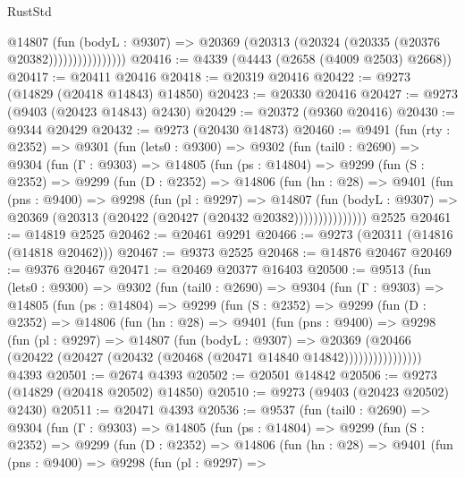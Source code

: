 \begin{lexlean}{RustStd}
\begin{coremodule}
{\begin{coremodule}
{{{{{{{{{{{{{{{{{{{{{{{{{{{{{{{{{{{{{{{{{{{{{{{{{{{{{{{                        @14807
                          (fun (bodyL : @9307) =>
                          @20369 (@20313 (@20324 (@20335 (@20376 @20382))))))))))))))))
@20416 := @4339 (@4443 (@2658 (@4009 @2503) @2668))
@20417 := @20411 @20416
@20418 := @20319 @20416
@20422 := @9273 (@14829 (@20418 @14843) @14850)
@20423 := @20330 @20416
@20427 := @9273 (@9403 (@20423 @14843) @2430)
@20429 := @20372 (@9360 @20416)
@20430 := @9344 @20429
@20432 := @9273 (@20430 @14873)
@20460 := @9491
    (fun (rty : @2352) =>
    @9301
      (fun (lets0 : @9300) =>
      @9302
        (fun (tail0 : @2690) =>
        @9304
          (fun (Γ : @9303) =>
          @14805
            (fun (ps : @14804) =>
            @9299
              (fun (S : @2352) =>
              @9299
                (fun (D : @2352) =>
                @14806
                  (fun (hn : @28) =>
                  @9401
                    (fun (pns : @9400) =>
                    @9298
                      (fun (pl : @9297) =>
                      @14807
                        (fun (bodyL : @9307) =>
                        @20369 (@20313 (@20422 (@20427 (@20432 @20382)))))))))))))))
    @2525
@20461 := @14819 @2525
@20462 := @20461 @9291
@20466 := @9273 (@20311 (@14816 (@14818 @20462)))
@20467 := @9373 @2525
@20468 := @14876 @20467
@20469 := @9376 @20467
@20471 := @20469 @20377 @16403
@20500 := @9513
    (fun (lets0 : @9300) =>
    @9302
      (fun (tail0 : @2690) =>
      @9304
        (fun (Γ : @9303) =>
        @14805
          (fun (ps : @14804) =>
          @9299
            (fun (S : @2352) =>
            @9299
              (fun (D : @2352) =>
              @14806
                (fun (hn : @28) =>
                @9401
                  (fun (pns : @9400) =>
                  @9298
                    (fun (pl : @9297) =>
                    @14807
                      (fun (bodyL : @9307) =>
                      @20369
                        (@20466
                          (@20422 (@20427 (@20432 (@20468 (@20471 @14840 @14842))))))))))))))))
    @4393
@20501 := @2674 @4393
@20502 := @20501 @14842
@20506 := @9273 (@14829 (@20418 @20502) @14850)
@20510 := @9273 (@9403 (@20423 @20502) @2430)
@20511 := @20471 @4393
@20536 := @9537
    (fun (tail0 : @2690) =>
    @9304
      (fun (Γ : @9303) =>
      @14805
        (fun (ps : @14804) =>
        @9299
          (fun (S : @2352) =>
          @9299
            (fun (D : @2352) =>
            @14806
              (fun (hn : @28) =>
              @9401
                (fun (pns : @9400) =>
                @9298
                  (fun (pl : @9297) =>
}}}}}}}}}}}}}}}}}}}}}}}}}}}}}}}}}}}}}}}}}}}}}}}}}}}}}}}
\end{coremodule}}
\end{coremodule}
\end{lexlean}
